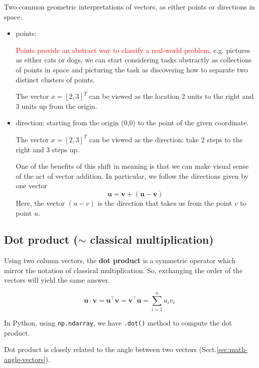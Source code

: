 Two common geometric interpretations of vectors, as either points or directions in space. 
\begin{itemize}
  \item points: 
  
 \textcolor{red}{Points provide an abstract way to classify a real-world
 problem}, e.g.
 pictures as either cats or dogs, we can start considering tasks abstractly as
 collections of points in space and picturing the task as discovering how to
 separate two distinct clusters of points.
 
 
The vector $x=[2,3]^T$ can be viewed  as the location 2 units to the right and 3
units up from the origin.
  
  \item direction: starting from the origin (0,0) to the point of the given coordinate.
  
The vector $x=[2,3]^T$ can be viewed  as the direction: take 2 steps to the right and 3
steps up.


  One of the benefits of this shift in meaning is that we can make visual sense
  of the act of vector addition. In particular, we follow the directions given
  by one vector
\begin{equation}
\mathbf{u} = \mathbf{v} + (\mathbf{u}-\mathbf{v})
\end{equation}
Here, the vector $(u-v)$ is the direction that takes us from the point $v$ to point $u$.
  
  
\end{itemize}

\subsection{Dot product ($\sim$ classical multiplication)}
\label{sec:math-dot-product-vectors}

Using two column vectors, the {\bf dot product} is a symmetric operator which mirror the notation of classical multiplication.
So, exchanging the order of the vectors will yield the same answer.

\begin{equation}
\mathbf{u}\cdot\mathbf{v} = \mathbf{u}^\top\mathbf{v} = \mathbf{v}^\top\mathbf{u} = \sum_{i=1}^n u_i v_i
\end{equation}

In Python, using \verb!np.ndarray!, we have \verb!.dot()! method to compute the dot product.

Dot product is closely related to the angle between two vectors (Sect.\ref{sec:math-angle-vectors}).


